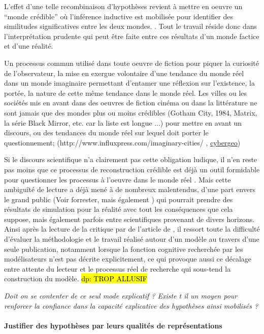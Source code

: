 L'effet d'une telle recombinaison d'hypothèses revient à mettre en oeuvre un \enquote{monde crédible} où l'inférence inductive est mobilisée pour identifier des similitudes significatives entre les deux mondes. \autocites{Livet2006, Phan2008}. Tout le travail réside donc dans l'interprétation prudente qui peut être faite entre ces résultats d'un monde factice et d'une réalité.

Un processus commun utilisé dans toute oeuvre de fiction pour piquer la curiosité de l'observateur, la mise en exergue volontaire d'une tendance du monde réel dans un monde imaginaire permettant d'entamer une réflexion sur l'existence, la portée, la nature de cette même tendance dans le monde réel. Les villes ou les sociétés mis en avant dans des oeuvres de fiction cinéma ou dans la littérature ne sont jamais que des mondes plus ou moins crédibles (Gotham City, 1984, Matrix, la série Black Mirror, etc. car la liste est longue ...)  pour mettre en avant un discours, ou des tendances du monde réel sur lequel doit porter le questionnement; (http://www.influxpress.com/imaginary-cities/ , \href{http://cybergeo.revues.org/1170#tocto1n9?}{cybergeo})

Si le discours scientifique n'a clairement pas cette obligation ludique, il n'en reste pas moins que ce processus de reconstruction crédible est déjà un outil formidable pour questionner les processus à l'oeuvre dans le monde réel . Mais cette ambiguïté de lecture a déjà mené à de nombreux malentendus, d'une part envers le grand public (Voir forrester, mais également ) qui pourrait prendre des résultats de simulation pour la réalité avec tout les conséquences que cela suppose, mais également parfois entre scientifiques provenant de divers horizons. Ainsi après la lecture de la critique par \textcite{Chattoe2011} de l'article de \textcite{Yanoff2009}, il ressort toute la difficulté d'évaluer la méthodologie et le travail réalisé autour d'un modèle au travers d'une seule publication, notamment lorsque la fonction cognitive recherchée par les modélisateurs n'est pas décrite explicitement, ce qui provoque aussi ce décalage entre attente du lecteur et le processus réel de recherche qui sous-tend la construction du modèle. \hl{dp: TROP ALLUSIF}

\textit{Doit on se contenter de ce seul mode explicatif ? Existe t il un moyen pour renforcer la confiance dans la capacité explicative des hypothèses ainsi mobilisés ? } 

\paragraph{Justifier des hypothèses par leurs qualités de représentations}
\label{justifier_hypothese}

